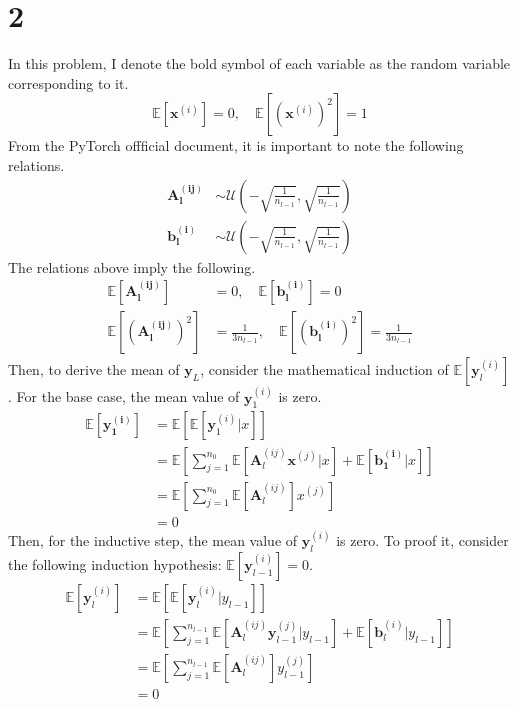 \documentclass[10pt]{article}
\begin{document}
\section*{2}
In this problem, I denote the bold symbol of each variable as the random variable corresponding to it. 
\begin{equation*}
    \mathbb{E}[\mathbf{x}^{(i)}] = 0,\quad \mathbb{E}\left[\left(\mathbf{x}^{(i)}\right)^2\right] = 1
\end{equation*}
From the PyTorch offficial document, it is important to note the following relations.
\begin{align*}
    \mathbf{A_l^{(ij)}} &\sim \mathcal{U}\left(-\sqrt{\frac{1}{n_{l-1}}},\sqrt{\frac{1}{n_{l-1}}}\right)\\
    \mathbf{b_l^{(i)}} &\sim \mathcal{U}\left(-\sqrt{\frac{1}{n_{l-1}}},\sqrt{\frac{1}{n_{l-1}}}\right)
\end{align*}
The relations above imply the following. 
\begin{align*}
    \mathbb{E}[\mathbf{A_l^{(ij)}}] &= 0, \quad \mathbb{E}[\mathbf{b_l^{(i)}}] = 0\\ 
    \mathbb{E}\left[\left(\mathbf{A_l^{(ij)}}\right)^2\right] &= \frac{1}{3n_{l-1}}, \quad \mathbb{E}\left[\left(\mathbf{b_l^{(i)}}\right)^2\right] = \frac{1}{3n_{l-1}} 
\end{align*}
Then, to derive the mean of $\mathbf{y}_L$, consider the mathematical induction of $\mathbb{E}[\mathbf{y}_l^{(i)}]$.
For the base case, the mean value of $\mathbf{y}^{(i)}_1$ is zero. 
\begin{align*}
    \mathbb{E}[\mathbf{y_1^{(i)}}] &= \mathbb{E}[\mathbb{E}[\mathbf{y}_1^{(i)}|x]] \\ &= \mathbb{E}\left[\sum_{j=1}^{n_0}\mathbb{E}\left[\mathbf{A}_l^{(ij)}\mathbf{x}^{(j)}|x\right] + \mathbb{E}\left[\mathbf{b_1^{(i)}}|x\right]\right] \\
    &= \mathbb{E}\left[\sum_{j=1}^{n_0} \mathbb{E}\left[\mathbf{A}_l^{(ij)}\right]x^{(j)}\right] \\
    &= 0
\end{align*}
Then, for the inductive step, the mean value of $\mathbf{y}^{(i)}_l$ is zero. To proof it, consider the following induction hypothesis: $\mathbb{E}[\mathbf{y}^{(i)}_{l-1}] = 0$.
\begin{align*}
    \mathbb{E}[\mathbf{y}_l^{(i)}] &= \mathbb{E}[\mathbb{E}[\mathbf{y}_l^{(i)}|y_{l-1}]]\\&= \mathbb{E}\left[\sum_{j=1}^{n_{l-1}} \mathbb{E}\left[\mathbf{A}_l^{(ij)}\mathbf{y}_{l-1}^{(j)}|y_{l-1}\right] + \mathbb{E}\left[\mathbf{b}_l^{(i)}|y_{l-1}\right]\right] \\
    &= \mathbb{E}\left[\sum_{j=1}^{n_{l-1}} \mathbb{E}\left[\mathbf{A}_l^{(ij)}\right]y_{l-1}^{(j)}\right] \\
    &= 0
\end{align*}
\end{document}
